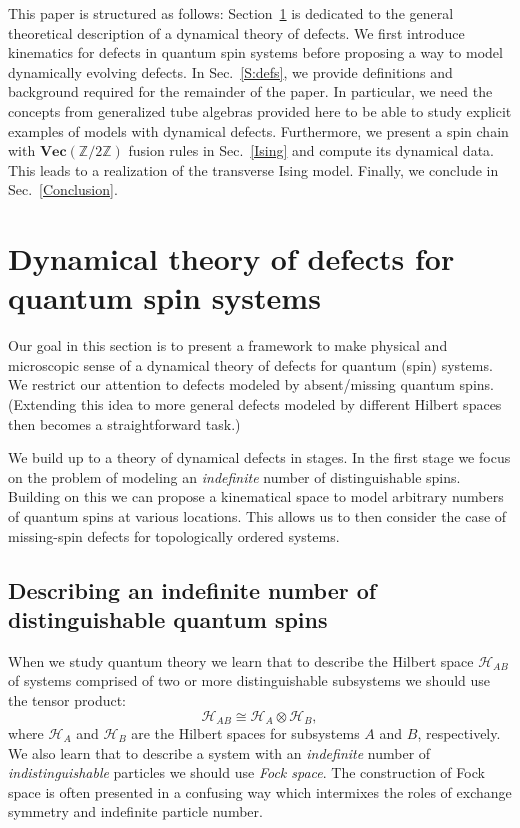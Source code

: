 \documentclass[aps,prx,twocolumn,superscriptaddress,noshowkeys]{revtex4-2}  %
\renewcommand{\Vec}{\textbf{Vec}}
\newcommand{\Z}{\mathbb{Z}}
\theoremstyle{plain}%
\theoremstyle{definition}
\theoremstyle{remark}
\begin{document}
This paper is structured as follows: Section~\ref{Gauging} is dedicated to the general theoretical description of a dynamical theory of defects. We first introduce kinematics for defects in quantum spin systems before proposing a way to model dynamically evolving defects. In Sec.~\ref{S:defs}, we provide definitions and background required for the remainder of the paper. In particular, we need the concepts from generalized tube algebras provided here to be able to study explicit examples of models with dynamical defects. Furthermore, we present a spin chain with $\Vec(\Z/2\Z)$ fusion rules in Sec.~\ref{Ising} and compute its dynamical data. This leads to a realization of the transverse Ising model. Finally, we conclude in Sec.~\ref{Conclusion}.


\section{Dynamical theory of defects for quantum spin systems}
\label{Gauging}

Our goal in this section is to present a framework to make physical and microscopic sense of a dynamical theory of defects for quantum (spin) systems. We restrict our attention to defects modeled by absent/missing quantum spins. (Extending this idea to more general defects modeled by different Hilbert spaces then becomes a straightforward task.)

We build up to a theory of dynamical defects in stages. In the first stage we focus on the problem of modeling an \emph{indefinite} number of distinguishable spins. Building on this we can propose a kinematical space to model arbitrary numbers of quantum spins at various locations. This allows us to then consider the case of missing-spin defects for topologically ordered systems.

\subsection{Describing an indefinite number of distinguishable quantum spins}

When we study quantum theory we learn that to describe the Hilbert space $\mathcal{H}_{AB}$ of systems comprised of two or more distinguishable subsystems we should use the tensor product:
\begin{equation}
\mathcal{H}_{AB} \cong \mathcal{H}_A\otimes \mathcal{H}_B,
\end{equation}
where $\mathcal{H}_A$ and $\mathcal{H}_B$ are the Hilbert spaces for subsystems $A$ and $B$, respectively. We also learn that to describe a system with an \emph{indefinite} number of \emph{indistinguishable} particles we should use \emph{Fock space}. The construction of Fock space is often presented in a confusing way which intermixes the roles of exchange symmetry and indefinite particle number.
\end{document}
